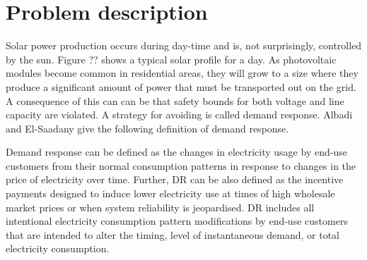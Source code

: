 \documentclass[class=book, crop=false]{standalone}
\begin{document}
\section{Problem description}\label{section:problem_description}
Solar power production occurs during day-time and is, not surprisingly, controlled by the sun. Figure ?? shows a typical solar profile for a day. As photovoltaic modules become common in residential areas, they will grow to a size where they produce a significant amount of power that must be transported out on the grid. A consequence of this can can be that safety bounds for both voltage and line capacity are violated. A strategy for avoiding is called demand response. Albadi and El-Saadany give the following definition of demand response.\cite{demand_response_definition}

\begin{displayquote}
Demand response can be defined as the changes in electricity usage by end-use customers from their normal consumption patterns in response to changes in the price of electricity over time. Further, DR can be also defined as the incentive payments designed to induce lower electricity use at times of high wholesale market prices or when system reliability is jeopardised. DR includes all intentional electricity consumption pattern modifications by end-use customers that are intended to alter the timing, level of
instantaneous demand, or total electricity consumption.
\end{displayquote}
\end{document}
